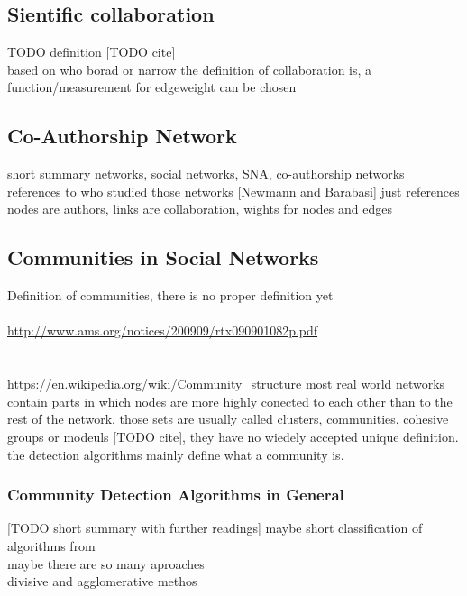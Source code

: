 \documentclass[runningheads,a4paper]{llncs}
\begin{document}
\subsection{Sientific collaboration}
\label{related-collabo}
TODO definition [TODO cite]\\
based on who borad or narrow the definition of collaboration is, a function/measurement for edgeweight can be chosen

\subsection{Co-Authorship Network}
\label{related-coauth}
short summary networks, social networks, SNA, co-authorship networks\\
references to who studied those networks [Newmann and Barabasi] just references\\
nodes are authors, links are collaboration, wights for nodes and edges\\

\subsection{Communities in Social Networks}
\label{related-communities}
Definition of communities, there is no proper definition yet\\
\cite{girvan2002community}\\
\url{http://www.ams.org/notices/200909/rtx090901082p.pdf}\\
\cite{palla2005uncovering}\\
\cite{fortunato2010community}\\
\url{https://en.wikipedia.org/wiki/Community_structure}
most real world networks contain parts in which nodes are more highly conected to each other than to the rest of the network, those sets are usually called clusters, communities, cohesive groups or modeuls [TODO cite], they have no wiedely accepted unique definition. the detection algorithms mainly define what a community is.

\subsubsection{Community Detection Algorithms in General}
\label{related-communities-general}
[TODO short summary with further readings]
maybe short classification of algorithms from~\cite{fortunato2010community}\\
maybe there are so many aproaches\\
divisive and agglomerative methos\\
\end{document}
